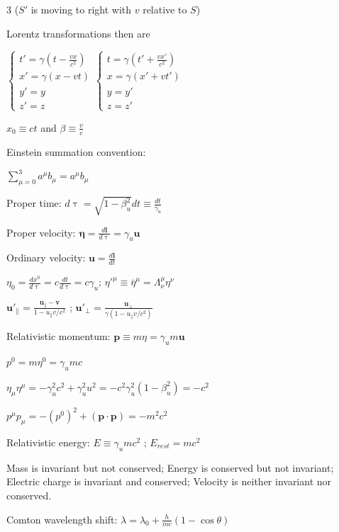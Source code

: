 \documentclass[a4paper,twoside]{article}
\begin{document}
\begin{multicols*}{3}
(\(S'\) is moving to right with \(v\) relative to \(S\))

Lorentz transformations then are

\(\begin{cases}
    t' = \gamma (t -  \frac{v x}{c^2}) \\
    x' = \gamma (x - vt) \\
    y' = y \\
    z' = z
\end{cases}
\begin{cases}
    t = \gamma (t' + \frac{v x'}{c^2}) \\
    x = \gamma (x' + vt') \\
    y = y' \\
    z = z'
\end{cases}\)

\(x_0 \equiv ct\) and \(\beta \equiv \frac{v}{c}\)

Einstein summation convention:

\(\sum_{\mu=0}^3 a^\mu b_\mu = a^\mu b_\mu\)

Proper time:
\(d\uptau = \sqrt{1 - \beta_u^2}dt \equiv \frac{dt}{\gamma_u}\)

Proper velocity:
\(\bm \eta = \frac{d\bm l}{d\uptau} = \gamma_u \bm u\)

Ordinary velocity:
\(\bm u = \frac{d\bm l}{dt}\)

\(\eta_0 = \frac{dx^0}{d\uptau} = c \frac{dt}{d\uptau} = c\gamma_u\);
\(\eta'^\mu \equiv \bar{\eta}^\mu = \Lambda_\nu^\mu \eta^\nu\)

\(\bm u'_\parallel = \frac{\bm u_\parallel-\bm v}{1 - u_\parallel v/c^2}\) ; \(\bm u'_\perp = \frac{\bm u_\perp}{\gamma (1 - u_\parallel v/c^2)}\)

Relativistic momentum:
\(\bm p \equiv  m \eta =  \gamma_u m \bm u\)

\(p^0 = m\eta^0 = \gamma_u mc\)

\(\eta_\mu \eta^\mu = - \gamma_u^2 c^2 + \gamma_u^2 u^2 = -c^2\gamma_u^2(1-\beta_u^2) = -c^2\)

\(p^\mu p_\mu = -(p^0)^2+ (\bm p \cdot \bm p) = -m^2c^2\)



Relativistic energy:
\(E \equiv \gamma_u mc^2\) ;
\(E_{rest}=mc^2\)

Mass is invariant but not conserved;
Energy is conserved but not invariant;
Electric charge is invariant and conserved;
Velocity is neither invariant nor conserved.


Comton wavelength shift:
\(\lambda = \lambda_0 + \frac{h}{mc}(1-\cos \theta)\)


\end{multicols*}
\end{document}
